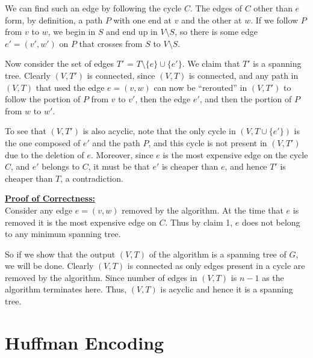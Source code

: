 \documentclass[a4paper]{article}
\begin{document}
\begin{enumerate}[label=(\alph*)]
    We can ﬁnd such an edge by following the cycle $C$. The edges of $C$ other than $e$ form, by deﬁnition, a path $P$ with one end at $v$ and the other at $w$. If we follow $P$ from $v$ to $w$, we begin in $S$ and end up in $V \setminus S$, so there is some edge $e' = (v',w')$ on $P$ that crosses from $S$ to $V \setminus S$.
    
    Now consider the set of edges $T'$ = $T \setminus \{e\} \cup \{e'\}$. We claim that $T'$ is a spanning tree. Clearly $(V,T')$ is connected, since $(V,T)$ is connected, and any path in $(V,T)$ that used the edge $e = (v,w)$ can now be “rerouted” in $(V,T')$ to follow the portion of $P$ from $v$ to $v'$, then the edge $e'$, and then the portion of $P$ from $w$ to $w'$. 
    
    To see that $(V,T')$ is also acyclic, note that the only cycle in $(V,T\cup\{e'\})$ is the one composed of $e'$ and the path $P$, and this cycle is not present in $(V,T')$ due to the deletion of $e$.
    Moreover, since $e$ is the most expensive edge on the cycle $C$, and $e'$ belongs to $C$, it must be that $e'$ is cheaper than $e$, and hence $T'$ is cheaper than $T$, a contradiction. {\hfill\qedsymbol}
    
    \bigskip
    \underline{\textbf{Proof of Correctness:}}\\
    Consider any edge $e = (v, w)$ removed by the algorithm. At the time that $e$ is removed it is the most expensive edge on $C$. Thus by claim 1, $e$ does not belong to any minimum spanning tree.

    So if we show that the output $(V,T)$ of the algorithm is a spanning tree of $G$, we will be done. Clearly $(V,T)$ is connected as only edges present in a cycle are removed by the algorithm. Since number of edges in $(V,T)$ is $n-1$ as the algorithm terminates here. Thus, $(V,T)$ is acyclic and hence it is a spanning tree. {\hfill\qedsymbol}
\end{enumerate}

\newpage
\section{Huffman Encoding}
\end{document}
